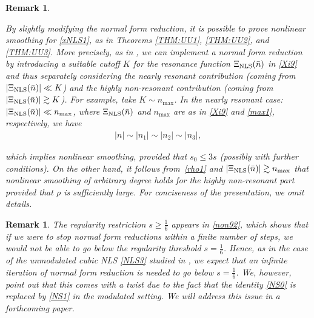 \documentclass[letterpaper, 11pt,  reqno]{amsart}
\newtheorem{remark}[theorem]{Remark}
\newcommand{\1}{\hspace{0.5mm}\text{I}\hspace{0.5mm}}
\newcommand{\noi}{\noindent}
\newcommand{\ges}{\gtrsim}
\newcommand{\NLS}{\text{\rm NLS} }
\numberwithin{equation}{section}
\numberwithin{theorem}{section}
\begin{document}
\begin{remark} \label{REM:NLS1}\rm



By slightly modifying the normal form reduction, 
 it is possible to prove nonlinear smoothing 
for \eqref{xNLS1},
as in Theorems \ref{THM:UU1}, \ref{THM:UU2}, and \ref{THM:UU3}.
More precisely, 
as  in 
\cite{GKO, OW}, 
we can implement a normal form reduction
by introducing a suitable cutoff $K$ for the resonance function $\Xi_{\NLS}(\bar n)$ in \eqref{Xi9}
and thus separately considering
the {\it nearly resonant} contribution 
(coming from $|\Xi_{\NLS}(\bar n)|\ll K$)
and the {\it highly
non-resonant} contribution
(coming from $|\Xi_{\NLS}(\bar n)|\ges K$).
For example, take $K \sim n_{\max}$.
In  the nearly resonant case: $|\Xi_\NLS(\bar n)| \ll n_{\max}$, 
where 
$\Xi_\NLS(\bar n)$ and 
$n_{\max}$ are as in 
\eqref{Xi9} and \eqref{max1}, respectively, 
we have
\begin{align*}
 |n|\sim |n_1|\sim|n_2|\sim|n_3|,
\end{align*}

\noi
which implies nonlinear smoothing, 
provided that $s_0 \le 3s$
(possibly with further conditions).
On the other hand, 
it follows from~\eqref{rho1} 
and $|\Xi_\NLS(\bar n)| \ges  n_{\max}$
that  nonlinear smoothing of arbitrary degree
holds 
for the highly non-resonant part
provided that $\rho$ is sufficiently large.
For conciseness of the presentation, we omit details.


\end{remark}






\begin{remark}\rm

The regularity restriction $s \ge \frac 16$
appears in 
\eqref{non92}, 
which shows that if we were to stop normal form reductions
within a finite number of steps, 
we would not be able to go below 
the regularity threshold $ s= \frac 16$.
Hence, as in  the case of the unmodulated cubic NLS  \eqref{NLS3}
studied in 
 \cite{GKO, OW}, 
we expect that an infinite iteration of normal form reduction is needed
to go below $ s= \frac 16$.
We, however,  point out
that this comes with a twist due to 
the fact that the identity \eqref{NS0}
is replaced by 
\eqref{NS1} in the modulated setting.
We will address this issue in a forthcoming paper.




\end{remark}
\end{document}
